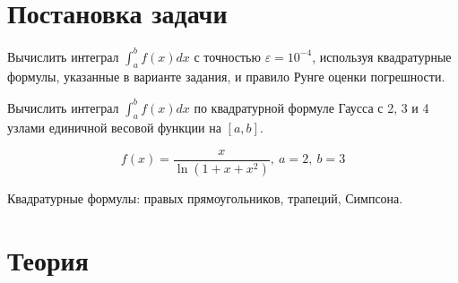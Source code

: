 \documentclass[12pt, a4paper]{article}
\begin{document}
	
	\begin{titlepage}
	\end{titlepage}
	
\tableofcontents
	
\section{Постановка задачи}

Вычислить интеграл $\int_{a}^{b}f(x)dx$ с точностью $\varepsilon = 10^{-4}$,
используя квадратурные формулы, указанные в варианте задания, и правило Рунге
оценки погрешности. 

Вычислить интеграл $\int_{a}^{b}f(x)dx$ по квадратурной формуле Гаусса с 2, 3 и
4 узлами единичной весовой функции на $[a, b]$. 

\begin{equation}
	f(x) = \frac{x}{\ln(1 + x + x^2 )},\ a = 2,\ b = 3
	\label{eqn:task}
\end{equation}

Квадратурные формулы: правых прямоугольников, трапеций, Симпсона.

\section{Теория}
\end{document}
